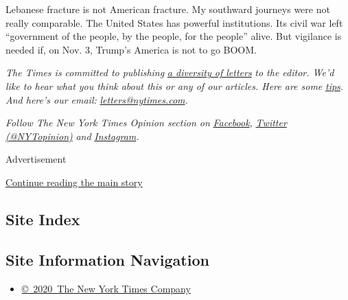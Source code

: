 Lebanese fracture is not American fracture. My southward journeys were
not really comparable. The United States has powerful institutions. Its
civil war left ``government of the people, by the people, for the
people'' alive. But vigilance is needed if, on Nov. 3, Trump's America
is not to go BOOM.

\emph{The Times is committed to publishing}
\href{https://www.nytimes.com/2019/01/31/opinion/letters/letters-to-editor-new-york-times-women.html}{\emph{a
diversity of letters}} \emph{to the editor. We'd like to hear what you
think about this or any of our articles. Here are some}
\href{https://help.nytimes.com/hc/en-us/articles/115014925288-How-to-submit-a-letter-to-the-editor}{\emph{tips}}\emph{.
And here's our email:}
\href{mailto:letters@nytimes.com}{\emph{letters@nytimes.com}}\emph{.}

\emph{Follow The New York Times Opinion section on}
\href{https://www.facebook.com/nytopinion}{\emph{Facebook}}\emph{,}
\href{http://twitter.com/NYTOpinion}{\emph{Twitter (@NYTopinion)}}
\emph{and}
\href{https://www.instagram.com/nytopinion/}{\emph{Instagram}}\emph{.}

Advertisement

\protect\hyperlink{after-bottom}{Continue reading the main story}

\hypertarget{site-index}{%
\subsection{Site Index}\label{site-index}}

\hypertarget{site-information-navigation}{%
\subsection{Site Information
Navigation}\label{site-information-navigation}}

\begin{itemize}
\tightlist
\item
  \href{https://help.nytimes.com/hc/en-us/articles/115014792127-Copyright-notice}{©~2020~The
  New York Times Company}
\end{itemize}


